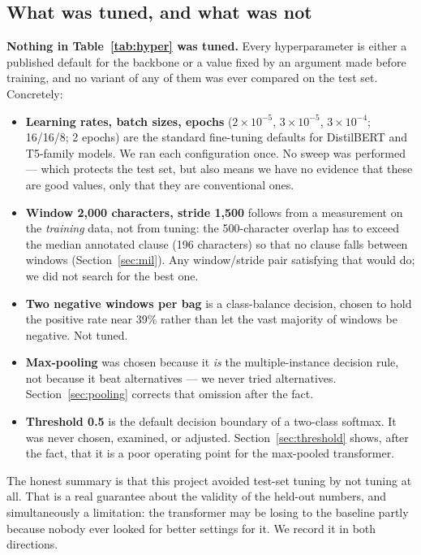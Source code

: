\subsection{What was tuned, and what was not}
\textbf{Nothing in Table~\ref{tab:hyper} was tuned.} Every hyperparameter is either a published default for the backbone or a value fixed by an argument made before training, and no variant of any of them was ever compared on the test set. Concretely:

\begin{itemize}[itemsep=3pt]
  \item \textbf{Learning rates, batch sizes, epochs} ($2\times10^{-5}$, $3\times10^{-5}$, $3\times10^{-4}$; 16/16/8; 2 epochs) are the standard fine-tuning defaults for DistilBERT and T5-family models. We ran each configuration once. No sweep was performed --- which protects the test set, but also means we have no evidence that these are good values, only that they are conventional ones.
  \item \textbf{Window 2{,}000 characters, stride 1{,}500} follows from a measurement on the \emph{training} data, not from tuning: the 500-character overlap has to exceed the median annotated clause (196 characters) so that no clause falls between windows (Section~\ref{sec:mil}). Any window/stride pair satisfying that would do; we did not search for the best one.
  \item \textbf{Two negative windows per bag} is a class-balance decision, chosen to hold the positive rate near 39\% rather than let the vast majority of windows be negative. Not tuned.
  \item \textbf{Max-pooling} was chosen because it \emph{is} the multiple-instance decision rule, not because it beat alternatives --- we never tried alternatives. Section~\ref{sec:pooling} corrects that omission after the fact.
  \item \textbf{Threshold 0.5} is the default decision boundary of a two-class softmax. It was never chosen, examined, or adjusted. Section~\ref{sec:threshold} shows, after the fact, that it is a poor operating point for the max-pooled transformer.
\end{itemize}

The honest summary is that this project avoided test-set tuning by not tuning at all. That is a real guarantee about the validity of the held-out numbers, and simultaneously a limitation: the transformer may be losing to the baseline partly because nobody ever looked for better settings for it. We record it in both directions.

